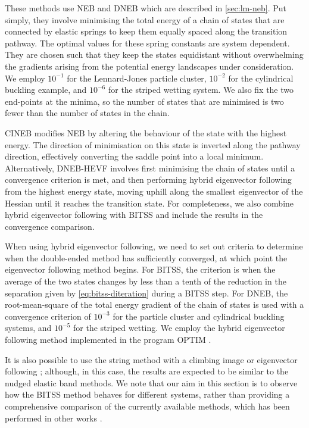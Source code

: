 These methods use NEB and DNEB which are described in \cref{sec:lm-neb}.
Put simply, they involve minimising the total energy of a chain of states that are connected by elastic springs to keep them equally spaced along the transition pathway.
The optimal values for these spring constants are system dependent.
They are chosen such that they keep the states equidistant without overwhelming the gradients arising from the potential energy landscapes under consideration.
We employ $10^{-1}$ for the Lennard-Jones particle cluster, $10^{-2}$ for the cylindrical buckling example, and $10^{-6}$ for the striped wetting system.
We also fix the two end-points at the minima, so the number of states that are minimised is two fewer than the number of states in the chain.

CINEB modifies NEB by altering the behaviour of the state with the highest energy.
The direction of minimisation on this state is inverted along the pathway direction, effectively converting the saddle point into a local minimum.
Alternatively, DNEB-HEVF involves first minimising the chain of states until a convergence criterion is met, and then performing hybrid eigenvector following from the highest energy state, moving uphill along the smallest eigenvector of the Hessian until it reaches the transition state.
For completeness, we also combine hybrid eigenvector following with BITSS and include the results in the convergence comparison.

When using hybrid eigenvector following, we need to set out criteria to determine when the double-ended method has sufficiently converged, at which point the eigenvector following method begins.
For BITSS, the criterion is when the average of the two states changes by less than a tenth of the reduction in the separation given by \cref{eq:bitss-diteration} during a BITSS step.
For DNEB, the root-mean-square of the total energy gradient of the chain of states is used with a convergence criterion of $10^{-3}$ for the particle cluster and cylindrical buckling systems, and $10^{-5}$ for the striped wetting.
We employ the hybrid eigenvector following method implemented in the program OPTIM \cite{OPTIM}.

It is also possible to use the string method with a climbing image \cite{E2007} or eigenvector following \cite{Zimmerman2013}; although, in this case, the results are expected to be similar to the nudged elastic band methods.
We note that our aim in this section is to observe how the BITSS method behaves for different systems, rather than providing a comprehensive comparison of the currently available methods, which has been performed in other works \cite{Koslover2007,Sheppard2008}.

